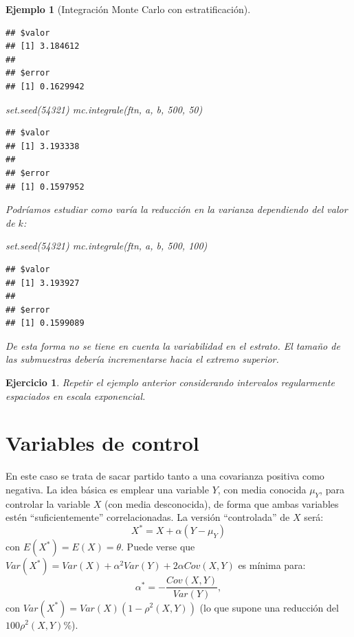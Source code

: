 \documentclass[
]{book}
\newenvironment{Shaded}{\begin{snugshade}}{\end{snugshade}}
\newcommand{\DecValTok}[1]{\textcolor[rgb]{0.00,0.00,0.81}{#1}}
\newcommand{\FunctionTok}[1]{\textcolor[rgb]{0.00,0.00,0.00}{#1}}
\newcommand{\NormalTok}[1]{#1}
\theoremstyle{break}
\newtheorem{exercise}{Ejercicio}[chapter]
\newtheorem{example}{Ejemplo}[chapter]
\theoremstyle{nonumberplain}
\begin{document}
\begin{example}[Integración Monte Carlo con estratificación]
\begin{verbatim}
## $valor
## [1] 3.184612
## 
## $error
## [1] 0.1629942
\end{verbatim}

\begin{Shaded}
\begin{Highlighting}[]
\FunctionTok{set.seed}\NormalTok{(}\DecValTok{54321}\NormalTok{)}
\FunctionTok{mc.integrale}\NormalTok{(ftn, a, b, }\DecValTok{500}\NormalTok{, }\DecValTok{50}\NormalTok{)}
\end{Highlighting}
\end{Shaded}

\begin{verbatim}
## $valor
## [1] 3.193338
## 
## $error
## [1] 0.1597952
\end{verbatim}

Podríamos estudiar como varía la reducción en la varianza dependiendo del valor de \(k\):

\begin{Shaded}
\begin{Highlighting}[]
\FunctionTok{set.seed}\NormalTok{(}\DecValTok{54321}\NormalTok{)}
\FunctionTok{mc.integrale}\NormalTok{(ftn, a, b, }\DecValTok{500}\NormalTok{, }\DecValTok{100}\NormalTok{)}
\end{Highlighting}
\end{Shaded}

\begin{verbatim}
## $valor
## [1] 3.193927
## 
## $error
## [1] 0.1599089
\end{verbatim}

De esta forma no se tiene en cuenta la variabilidad en el estrato.
El tamaño de las submuestras debería incrementarse hacia el extremo superior.
\end{example}

\begin{exercise}
\protect\hypertarget{exr:integraleb}{}\label{exr:integraleb}
Repetir el ejemplo anterior considerando intervalos regularmente espaciados en escala exponencial.
\end{exercise}

\hypertarget{variables-de-control}{%
\section{Variables de control}\label{variables-de-control}}

En este caso se trata de sacar partido tanto a una covarianza
positiva como negativa.
La idea básica es emplear una variable \(Y\), con media conocida
\(\mu_{Y}\), para controlar la variable \(X\) (con media desconocida),
de forma que ambas variables estén ``suficientemente'' correlacionadas.
La versión ``controlada'' de \(X\) será:
\[X^{\ast}=X+\alpha \left(  Y-\mu_{Y}\right)\]
con \(E(X^{\ast})=E(X)=\theta\).
Puede verse que
\(Var(X^{\ast})=Var(X)+\alpha^{2}Var(Y)+2\alpha Cov(X,Y)\)
es mínima para:
\[\alpha^{\ast}=-\frac{Cov(X,Y)}{Var(Y)},\]
con \(Var(X^{\ast}) = Var(X) \left( 1-\rho^{2} \left( X, Y \right) \right)\)
(lo que supone una reducción del \(100\rho^{2}\left( X, Y \right) \%\)).
\end{document}
